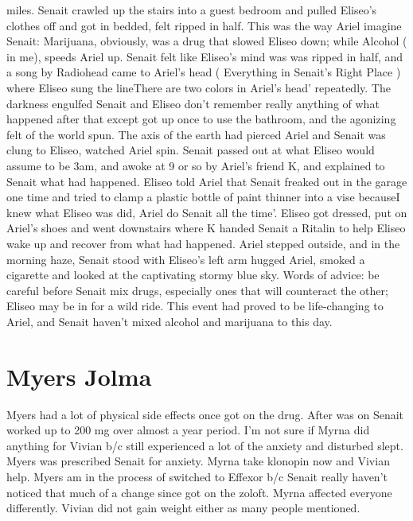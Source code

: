 \documentclass[12pt]{book}
\begin{document}
miles. Senait crawled up the stairs into a guest bedroom and pulled Eliseo's clothes off and got in bedded, felt ripped in half. This was the way Ariel imagine Senait: Marijuana, obviously, was a drug that slowed Eliseo down; while Alcohol ( in me), speeds Ariel up. Senait felt like Eliseo's mind was was ripped in half, and a song by Radiohead came to Ariel's head ( Everything in Senait's Right Place ) where Eliseo sung the lineThere are two colors in Ariel's head' repeatedly. The darkness engulfed Senait and Eliseo don't remember really anything of what happened after that except got up once to use the bathroom, and the agonizing felt of the world spun. The axis of the earth had pierced Ariel and Senait was clung to Eliseo, watched Ariel spin. Senait passed out at what Eliseo would assume to be 3am, and awoke at 9 or so by Ariel's friend K, and explained to Senait what had happened. Eliseo told Ariel that Senait freaked out in the garage one time and tried to clamp a plastic bottle of paint thinner into a vise becauseI knew what Eliseo was did, Ariel do Senait all the time'. Eliseo got dressed, put on Ariel's shoes and went downstairs where K handed Senait a Ritalin to help Eliseo wake up and recover from what had happened. Ariel stepped outside, and in the morning haze, Senait stood with Eliseo's left arm hugged Ariel, smoked a cigarette and looked at the captivating stormy blue sky. Words of advice: be careful before Senait mix drugs, especially ones that will counteract the other; Eliseo may be in for a wild ride. This event had proved to be life-changing to Ariel, and Senait haven't mixed alcohol and marijuana to this day.



\chapter{Myers Jolma}

Myers had a lot of physical side effects once got on the drug. After was on Senait worked up to 200 mg over almost a year period. I'm not sure if Myrna did anything for Vivian b/c still experienced a lot of the anxiety and disturbed slept. Myers was prescribed Senait for anxiety. Myrna take klonopin now and Vivian help. Myers am in the process of switched to Effexor b/c Senait really haven't noticed that much of a change since got on the zoloft. Myrna affected everyone differently. Vivian did not gain weight either as many people mentioned.
\end{document}
